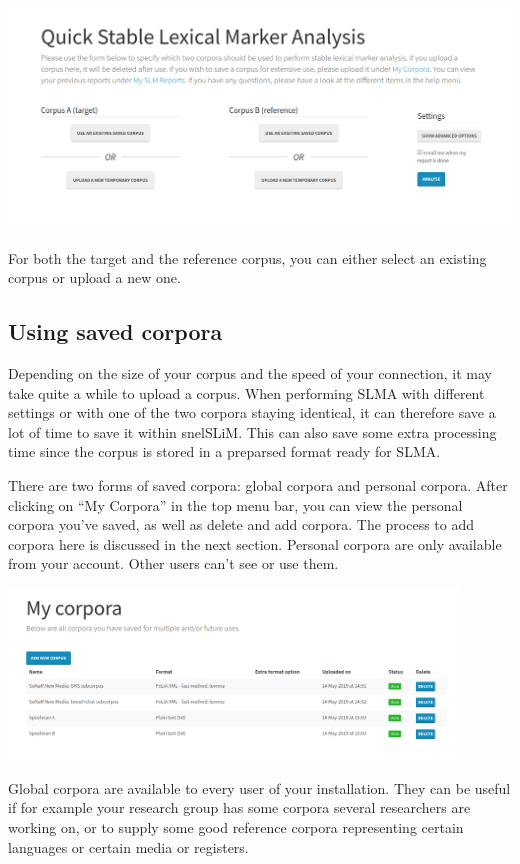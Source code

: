 \documentclass[11pt,a4paper]{article}
\begin{document}
\centerline{\includegraphics[width=\textwidth]{images/form.png}}

For both the target and the reference corpus, you can either select an existing corpus or upload a new one. 

\subsection{Using saved corpora}

Depending on the size of your corpus and the speed of your connection, it may take quite a while to upload a corpus. When performing SLMA with different settings or with one of the two corpora staying identical, it can therefore save a lot of time to save it within snelSLiM. This can also save some extra processing time since the corpus is stored in a preparsed format ready for SLMA.

There are two forms of saved corpora: global corpora and personal corpora. After clicking on ``My Corpora'' in the top menu bar, you can view the personal corpora you've saved, as well as delete and add corpora. The process to add corpora here is discussed in the next section. Personal corpora are only available from your account. Other users can't see or use them.

\centerline{\includegraphics[width=0.9\textwidth]{images/mycorpora.png}}

Global corpora are available to every user of your installation. They can be useful if for example your research group has some corpora several researchers are working on, or to supply some good reference corpora representing certain languages or certain media or registers. 
\end{document}
